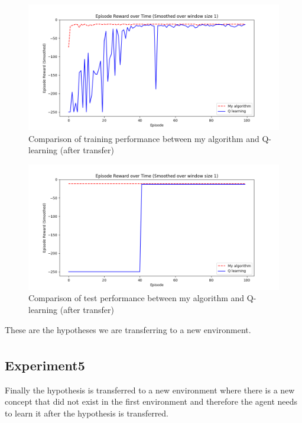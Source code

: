 \begin{figure}[!htb]
\centering
\includegraphics[width=1.0\textwidth]{./figures/experiment4_after_training}
\caption{Comparison of training performance between my algorithm and Q-learning (after transfer)}
\label{experiment3_training}
\end{figure}

\begin{figure}[!htb]
\centering
\includegraphics[width=1.0\textwidth]{./figures/experiment4_after_test}
\caption{Comparison of test performance between my algorithm and Q-learning (after transfer)}
\label{experiment3_test}
\end{figure}

These are the hypotheses we are transferring to a new environment.
\begin{equation*}
\begin{split}
\end{split}
\end{equation*}

\newpage
\subsection{Experiment5}
Finally the hypothesis is transferred to a new environment where there is a new concept that did not exist in the first environment
and therefore the agent needs to learn it after the hypothesis is transferred.
